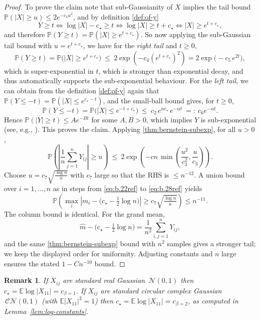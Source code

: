 \documentclass[11pt,a4paper]{article}
\newtheorem{remark}{Remark}[section]
\newcommand{\be}{\begin{equation}}
\newcommand{\ee}{\end{equation}}
\newcommand{\Prob}{\mathbb{P}}
\begin{document}
\begin{proof}
To prove the claim note that sub-Gaussianity of $X$ implies the tail bound $\Prob(|X|\geq u)\leq 2 e^{-c_4u^2}$, and by definition \cref{def:of-y}
\be
Y\geq t \iff \log|X|-c_\star \geq t \iff \log|X|\geq t+c_\star \iff |X| \geq e^{t+c_\star}, 
\ee
and therefore $\Prob(Y\geq t)=\Prob(|X|\geq e^{t+c_\star})$. So now applying the sub-Gaussian tail bound with $u=e^{t+c_\star}$, we have for the \emph{right tail} and $t\ge0$,
\begin{equation}
\Prob(Y\ge t)=\Prob\big(|X|\ge e^{t+c_\star}\big)\ \le\ 2\exp(-c_4(e^{t+c_\star})^2) = 2\exp\!\big(-c_5\,e^{2t}\big),
\end{equation}
which is super-exponential in $t$, which is stronger than exponential decay, and thus automatically supports the sub-exponential behaviour. For the \emph{left tail}, we can obtain from the definition \cref{def:of-y} again that $\Prob(Y\leq -t)=\Prob(|X|\leq e^{c_\star-t})$, and the small-ball bound gives, for $t\ge0$,
\begin{equation}
\Prob(Y\le -t)=\Prob\big(|X|\le e^{-t+c_\star}\big)\ \le\ c_2\,e^{\alpha c_\star}\,e^{-\alpha t} \ =:\ c_6e^{-\alpha t}.
\end{equation}
Hence $\Prob(|Y|\ge t)\le A e^{-B t}$ for some $A,B>0$, which implies $Y$ is sub-exponential (see, e.g., \cite{Vershynin2018HDP}). This proves the claim. Applying \cref{thm:bernstein-subexp}, for all $u>0$,
\begin{equation}
\Prob\!\left(\left|\frac1n\sum_{j=1}^n Y_{ij}\right|\geq u\right)
\ \le\ 2\exp\!\left(-c n\,\min\!\left(\frac{u^2}{c_3^2},\frac{u}{c_3}\right)\right).
\end{equation}
Choose $u=c_7\sqrt{\frac{\log n}{n}}$ with $c_7$ large so that the RHS is $\le n^{-12}$. A union bound over $i=1,\dots,n$ as in steps from \cref{eq:b.22ref} to \cref{eq:b.28ref} yields
\begin{equation}
\Prob\!\left(\max_i\left|m_i-\Big(c_\star-\tfrac12\log n\Big)\right|\geq c_7\sqrt{\tfrac{\log n}{n}}\right)\le n^{-11}.
\end{equation}
The column bound is identical. For the grand mean,
\begin{equation}
\hat{m}-\Big(c_\star-\tfrac12\log n\Big)=\frac1{n^2}\sum_{i,j=1}^n Y_{ij},
\end{equation}
and the same \cref{thm:bernstein-subexp} bound with $n^2$ samples gives a stronger tail; we keep the displayed order for uniformity. Adjusting constants and $n$ large ensures the stated $1-Cn^{-10}$ bound.
\end{proof}
\begin{remark}
If $X_{ij}$ are standard real Gaussian $\,\mathcal N(0,1)$ then $c_\star=\mathbb E\log|X_{11}|=c_{\beta=1}$. If $X_{ij}$ are standard circular complex Gaussian $\,\mathcal{CN}(0,1)$ (with $\mathbb E|X_{11}|^2=1$) then $c_\star=\mathbb E\log|X_{11}|=c_{\beta=2}$, as computed in Lemma~\ref{lem:log-constants}.
\end{remark}
\end{document}
